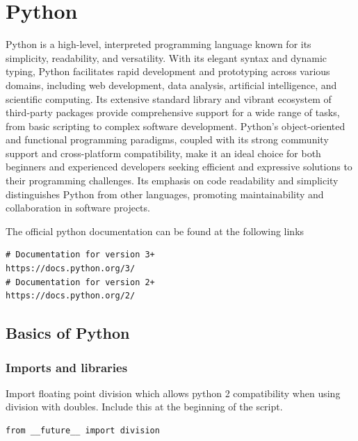 \chapter{Python}
\thispagestyle{fancy}
\lstset{}\lstset{language=Python, style=pythonstyle}

Python is a high-level, interpreted programming language known for its simplicity, readability, and versatility. With its elegant syntax and dynamic typing, Python facilitates rapid development and prototyping across various domains, including web development, data analysis, artificial intelligence, and scientific computing. Its extensive standard library and vibrant ecosystem of third-party packages provide comprehensive support for a wide range of tasks, from basic scripting to complex software development. Python's object-oriented and functional programming paradigms, coupled with its strong community support and cross-platform compatibility, make it an ideal choice for both beginners and experienced developers seeking efficient and expressive solutions to their programming challenges. Its emphasis on code readability and simplicity distinguishes Python from other languages, promoting maintainability and collaboration in software projects.

\myindent The official python documentation can be found at the following links
\begin{lstlisting}
# Documentation for version 3+
https://docs.python.org/3/
# Documentation for version 2+
https://docs.python.org/2/
\end{lstlisting}











\section{Basics of Python}












\subsection{Imports and libraries}

Import floating point division which allows python 2 compatibility when using division with doubles. Include this at the beginning of the script.
\begin{lstlisting}
from __future__ import division
\end{lstlisting}

